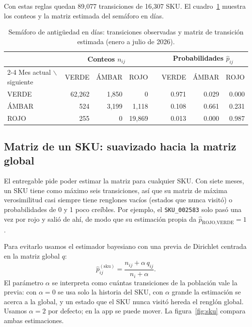 \documentclass[11pt,letterpaper]{article}
\begin{document}
Con estas reglas quedan 89,077 transiciones de 16,307 SKU. El cuadro~\ref{tab:conteos} muestra los conteos y la matriz estimada del semáforo en días.

\begin{table}[H]
\centering\small
\begin{tabular}{@{}l rrr c rrr@{}}
\toprule
 & \multicolumn{3}{c}{Conteos $n_{ij}$} & & \multicolumn{3}{c}{Probabilidades $\hat p_{ij}$} \\
\cmidrule{2-4}\cmidrule{6-8}
Mes actual $\backslash$ siguiente & VERDE & ÁMBAR & ROJO & & VERDE & ÁMBAR & ROJO \\
\midrule
VERDE & 62,262 & 1,850 & 0 & & 0.971 & 0.029 & 0.000 \\
ÁMBAR & 524 & 3,199 & 1,118 & & 0.108 & 0.661 & 0.231 \\
ROJO & 255 & 0 & 19,869 & & 0.013 & 0.000 & 0.987 \\
\bottomrule
\end{tabular}
\caption{Semáforo de antigüedad en días: transiciones observadas y matriz de transición estimada (enero a julio de 2026).}
\label{tab:conteos}
\end{table}

\subsection{Matriz de un SKU: suavizado hacia la matriz global}

El entregable pide poder estimar la matriz para cualquier SKU. Con siete meses, un SKU tiene como máximo seis transiciones, así que su matriz de máxima verosimilitud casi siempre tiene renglones vacíos (estados que nunca visitó) o probabilidades de 0 y 1 poco creíbles. Por ejemplo, el \texttt{SKU\_002583} solo pasó una vez por rojo y salió de ahí, de modo que su estimación propia da $\hat p_{\text{ROJO},\text{VERDE}} = 1$.

Para evitarlo usamos el estimador bayesiano con una previa de Dirichlet centrada en la matriz global $q$:
\begin{equation}
  \hat p^{(\text{sku})}_{ij} = \frac{n_{ij} + \alpha\, q_{ij}}{n_i + \alpha}.
\end{equation}
El parámetro $\alpha$ se interpreta como cuántas transiciones de la población vale la previa: con $\alpha = 0$ se usa solo la historia del SKU, con $\alpha$ grande la estimación se acerca a la global, y un estado que el SKU nunca visitó hereda el renglón global. Usamos $\alpha = 2$ por defecto; en la app se puede mover. La figura~\ref{fig:sku} compara ambas estimaciones.
\end{document}
